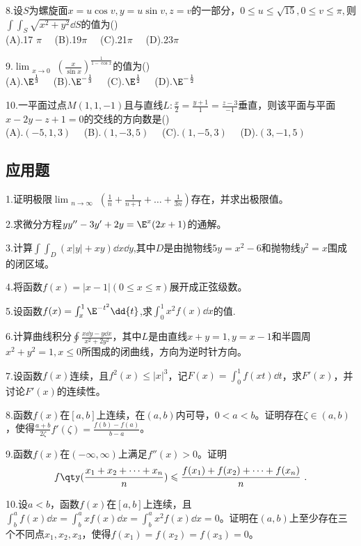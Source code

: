 8.设$S$为螺旋面$x=u\cos v,y=u\sin v,z=v$的一部分，$0\leqslant u \leqslant \sqrt{15},0 \leqslant v \leqslant \pi,$则$\int \int_{S} \sqrt{x^2+y^2} \dd{S}$的值为()\\
(A).17 $\pi \quad$ (B).19$ \pi \quad$ (C).21$ \pi \quad$  (D).23$ \pi \quad$

9.$\displaystyle \lim_{\substack{x \to 0}} (\frac{x}{\sin x})^{\frac{1}{1-\cos x}}$的值为()\\
(A).$\E^\frac{1}{3}\quad$     (B).$\E^{-\frac{1}{3}}\quad$    (C).$\E^\frac{1}{2}\quad$      (D).$\E^{-\frac{1}{2}}\quad$

10.一平面过点$M(1,1,-1)$且与直线$L:\frac{x}{2}=\frac{y+1}{1}=\frac{z-3}{-1}$垂直，则该平面与平面$x-2y-z+1=0$的交线的方向数是()\\
(A).$(-5,1,3)\quad$  (B).$(1,-3,5)\quad$  (C).$(1,-5,3)\quad$   (D).$(3,-1,5)\quad$

\subsection{应用题}
1.证明极限$\displaystyle \lim_{\substack {n \to \infty}}(\frac{1}{n}+\frac{1}{n+1}+ \dots +\frac{1}{3n})$存在，并求出极限值。

2.求微分方程$yy''-3y'+2y=\E^x(2x+1)$的通解。

3.计算$\int \int_{D}(x|y|+xy)\dd{x}\dd{y}$,其中$D$是由抛物线$5y=x^2-6$和抛物线$y^2=x$围成的闭区域。

4.将函数$f(x)=|x-1| (0\leqslant x \leqslant \pi)$展开成正弦级数。

5.设函数$f(x)=\int_{x}^{1}\E^{-t^2}\dd{t}$,求$\int_{0}^{1}x^2f(x)\dd{x}$的值.

6.计算曲线积分$\oint \frac{x\dd{y}-y\dd{x}}{x^2+2y^2}$，其中$L$是由直线$x+y=1,y=x-1$和半圆周$x^2+y^2=1,x \leqslant 0$所围成的闭曲线，方向为逆时针方向。

7.设函数$f(x)$连续，且$f^2(x) \leqslant {|x|}^3$，记$F(x)=\int_{0}^{1}f(xt)\dd{t}$，求$F'(x)$，并讨论$F'(x)$的连续性。

8.函数$f(x)$在$[a,b]$上连续，在$(a,b)$内可导，$0<a<b$。证明存在$\zeta \in(a,b)$，使得$\frac{a+b}{2\zeta}f'(\zeta)=\frac{f(b)-f(a)}{b-a}$。

9.函数$f(x)$在$(-\infty,\infty)$上满足$f''(x)>0$。证明
\begin{equation}
f \qty (\frac{x_1+x_2+\dots+x_n}{n}) \leqslant \frac{f(x_1)+f(x_2)+\dots+f(x_n)}{n}~.
\end{equation}


10.设$a<b$，函数$f(x)$在$[a,b]$上连续，且$\int_{b}^{a}f(x)\dd{x}=\int_{b}^{a}xf(x)\dd{x}=\int_{b}^{a}x^2f(x)\dd{x}=0$。证明在$(a,b)$上至少存在三个不同点$x_1,x_2,x_3$，使得$f(x_1)=f(x_2)=f(x_3)=0$。
